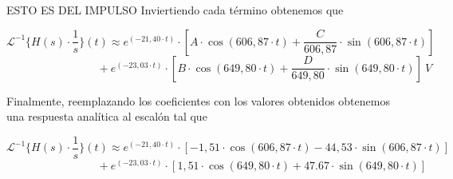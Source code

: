 \documentclass[11pt,a4paper]{report}
\begin{document}
\bigskip
ESTO ES DEL IMPULSO
Inviertiendo cada término obtenemos que

\[\mathcal{L}^{-1}\{H(s) \cdot \frac{1}{s}\}(t) \approx e^{(-21,40 \cdot t)} \cdot [A \cdot \cos(606,87 \cdot t) + \frac{C}{606,87} \cdot \sin(606,87 \cdot t)]\] 
\[\phantom{asadsdasdasdasda} + e^{(-23,03 \cdot t)} \cdot [B \cdot \cos(649,80 \cdot t) + \frac{D}{649,80} \cdot \sin(649,80 \cdot t)] \ V\]

\bigskip
Finalmente, reemplazando los coeficientes con los valores obtenidos obtenemos una respuesta analítica al escalón tal que

\[\mathcal{L}^{-1}\{H(s) \cdot \frac{1}{s}\}(t) \approx e^{(-21,40 \cdot t)} \cdot [-1,51 \cdot \cos(606,87 \cdot t) -44,53 \cdot \sin(606,87 \cdot t)]\] 
\[\phantom{asadsdasdasdasda} + e^{(-23,03 \cdot t)} \cdot [1,51 \cdot \cos(649,80 \cdot t) + 47.67 \cdot \sin(649,80 \cdot t)]\]
\end{document}
